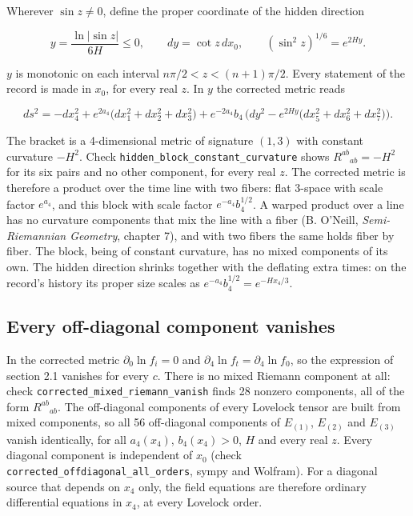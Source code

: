 \documentclass[11pt]{article}
\begin{document}
Wherever $\sin z \neq 0$, define the proper coordinate of the hidden direction

\[
y = \frac{\ln|\sin z|}{6H} \le 0,\qquad dy = \cot z\,dx_0,\qquad (\sin^2 z)^{1/6} = e^{2Hy} .
\]

$y$ is monotonic on each interval $n\pi/2 < z < (n+1)\pi/2$. Every statement of the record is made in $x_0$, for every real $z$. In $y$ the corrected metric reads

\[
ds^2 = -dx_4^2 + e^{2a_4}\big(dx_1^2+dx_2^2+dx_3^2\big) + e^{-2a_4}b_4\,\Big(dy^2 - e^{2Hy}\big(dx_5^2+dx_6^2+dx_7^2\big)\Big).
\]

The bracket is a 4-dimensional metric of signature $(1,3)$ with constant curvature $-H^2$. Check \texttt{hidden\_b\allowbreak{}lock\_con\allowbreak{}stant\_cu\allowbreak{}rvature} shows $R^{ab}{}_{ab} = -H^2$ for its six pairs and no other component, for every real $z$. The corrected metric is therefore a product over the time line with two fibers: flat 3-space with scale factor $e^{a_4}$, and this block with scale factor $e^{-a_4}b_4^{1/2}$. A warped product over a line has no curvature components that mix the line with a fiber (B. O'Neill, \emph{Semi-Riemannian Geometry}, chapter 7), and with two fibers the same holds fiber by fiber. The block, being of constant curvature, has no mixed components of its own. The hidden direction shrinks together with the deflating extra times: on the record's history its proper size scales as $e^{-a_4}b_4^{1/2} = e^{-Hx_4/3}$.

\subsection{Every off-diagonal component vanishes}

In the corrected metric $\partial_0\ln f_i = 0$ and $\partial_4\ln f_t = \partial_4\ln f_0$, so the expression of section 2.1 vanishes for every $c$. There is no mixed Riemann component at all: check \texttt{correcte\allowbreak{}d\_mixed\_\allowbreak{}riemann\_\allowbreak{}vanish} finds 28 nonzero components, all of the form $R^{ab}{}_{ab}$. The off-diagonal components of every Lovelock tensor are built from mixed components, so all 56 off-diagonal components of $E_{(1)}$, $E_{(2)}$ and $E_{(3)}$ vanish identically, for all $a_4(x_4)$, $b_4(x_4) > 0$, $H$ and every real $z$. Every diagonal component is independent of $x_0$ (check \texttt{correcte\allowbreak{}d\_offdia\allowbreak{}gonal\_al\allowbreak{}l\_orders}, sympy and Wolfram). For a diagonal source that depends on $x_4$ only, the field equations are therefore ordinary differential equations in $x_4$, at every Lovelock order.
\end{document}
